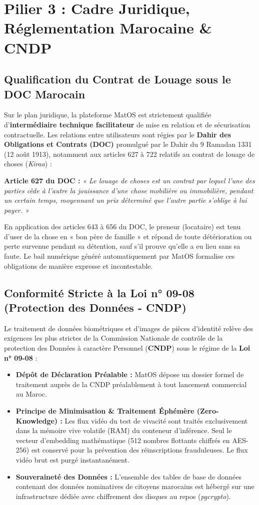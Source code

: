 \documentclass[11pt,a4paper]{report}
\begin{document}
\chapter{Pilier 3 : Cadre Juridique, Réglementation Marocaine \& CNDP}

\section{Qualification du Contrat de Louage sous le DOC Marocain}
Sur le plan juridique, la plateforme MatOS est strictement qualifiée d'\textbf{intermédiaire technique facilitateur} de mise en relation et de sécurisation contractuelle. Les relations entre utilisateurs sont régies par le \textbf{Dahir des Obligations et Contrats (DOC)} promulgué par le Dahir du 9 Ramadan 1331 (12 août 1913), notamment aux articles 627 à 722 relatifs au contrat de louage de choses (\textit{Kiraa}) :

\begin{tcolorbox}[techbox]
\textbf{Article 627 du DOC :} \textit{« Le louage de choses est un contrat par lequel l'une des parties cède à l'autre la jouissance d'une chose mobilière ou immobilière, pendant un certain temps, moyennant un prix déterminé que l'autre partie s'oblige à lui payer. »}
\end{tcolorbox}

En application des articles 643 à 656 du DOC, le preneur (locataire) est tenu d'user de la chose en « bon père de famille » et répond de toute détérioration ou perte survenue pendant sa détention, sauf s'il prouve qu'elle a eu lieu sans sa faute. Le bail numérique généré automatiquement par MatOS formalise ces obligations de manière expresse et incontestable.

\section{Conformité Stricte à la Loi n° 09-08 (Protection des Données - CNDP)}
Le traitement de données biométriques et d'images de pièces d'identité relève des exigences les plus strictes de la Commission Nationale de contrôle de la protection des Données à caractère Personnel (\textbf{CNDP}) sous le régime de la \textbf{Loi n° 09-08} :
\begin{itemize}[leftmargin=*]
    \item \textbf{Dépôt de Déclaration Préalable :} MatOS dépose un dossier formel de traitement auprès de la CNDP préalablement à tout lancement commercial au Maroc.
    \item \textbf{Principe de Minimisation \& Traitement Éphémère (Zero-Knowledge) :} Les flux vidéo du test de vivacité sont traités exclusivement dans la mémoire vive volatile (RAM) du conteneur d'inférence. Seul le vecteur d'embedding mathématique (512 nombres flottants chiffrés en AES-256) est conservé pour la prévention des réinscriptions frauduleuses. Le flux vidéo brut est purgé instantanément.
    \item \textbf{Souveraineté des Données :} L'ensemble des tables de base de données contenant des données nominatives de citoyens marocains est hébergé sur une infrastructure dédiée avec chiffrement des disques au repos (\textit{pgcrypto}).
\end{itemize}
\end{document}
